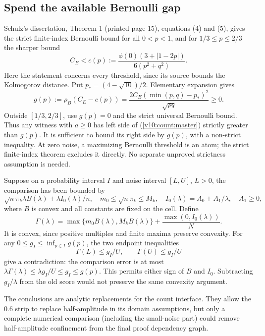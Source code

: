 \subsection{Spend the available Bernoulli gap}
Schulz's dissertation, Theorem 1 (printed page 15), equations (4) and (5), gives the strict finite-index
Bernoulli bound for all $0<p<1$, and for $1/3\le p\le2/3$ the sharper
bound
\[
 C_B<c(p):=\frac{\phi(0)(3+|1-2p|)}{6(p^2+q^2)}.
\]
Here the statement concerns every threshold, since its source bounds the
Kolmogorov distance. Put $p_*=(4-\sqrt{10})/2$. Elementary expansion gives
\begin{equation}\label{v10:count:gap}
 g(p):=\rho_B(C_E-c(p))
      =\frac{2C_E(\min(p,q)-p_*)^2}{\sqrt{pq}}\ge0.
\end{equation}
Outside $[1/3,2/3]$, use $g(p)=0$ and the strict universal Bernoulli bound.
Thus any witness with $a\ge0$ has left side of
(\ref{v10:count:master}) strictly greater than $g(p)$. It is sufficient
to bound its right side by $g(p)$, with a non-strict inequality.
At zero noise, a maximizing Bernoulli threshold is an atom; the strict
finite-index theorem excludes it directly. No separate unproved strictness
assumption is needed.

Suppose on a probability interval $I$ and noise interval $[L,U]$, $L>0$,
the comparison has been bounded by
\[
 \sqrt n\pi_k\lambda B(\lambda)+\lambda I_0(\lambda)/n,
 \quad m_0\le\sqrt n\pi_k\le M_k,
 \quad I_0(\lambda)=A_0+A_1/\lambda,\quad A_1\ge0,
\]
where $B$ is convex and all constants are fixed on the cell. Define
\[
 \Gamma(\lambda)=\max\{m_0B(\lambda),M_kB(\lambda)\}
                     +\frac{\max(0,I_0(\lambda))}{N}.
\]
It is convex, since positive multiples and finite maxima preserve convexity.
For any $0\le g_I\le\inf_{p\in I}g(p)$, the two endpoint inequalities
\begin{equation}\label{v10:count:gaptest}
 \Gamma(L)\le g_I/U,\qquad\Gamma(U)\le g_I/U
\end{equation}
give a contradiction: the comparison error is at most
$\lambda\Gamma(\lambda)\le\lambda g_I/U\le g_I\le g(p)$.
This permits either sign of $B$ and $I_0$. Subtracting $g_I/\lambda$
from the old score would not preserve the same convexity argument.

The conclusions are analytic replacements for the count interface. They
allow the $0.6$ strip to replace half-amplitude in its domain assumptions,
but only a complete numerical comparison (including the small-noise part)
could remove half-amplitude confinement from the final proof dependency graph.
